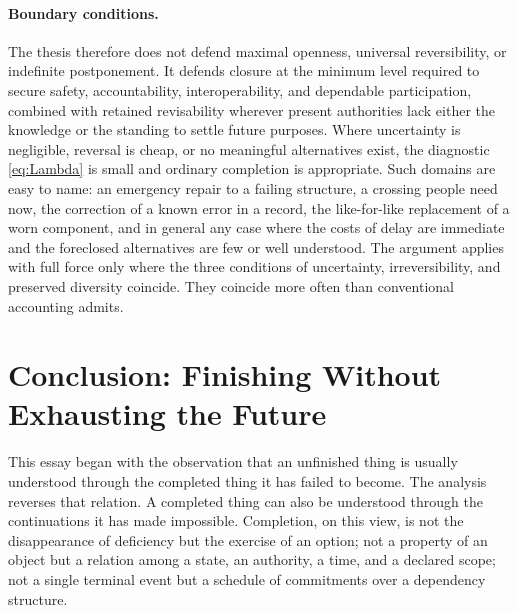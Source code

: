 \paragraph{Boundary conditions.} The thesis therefore does not defend maximal openness, universal reversibility, or indefinite postponement. It defends closure at the minimum level required to secure safety, accountability, interoperability, and dependable participation, combined with retained revisability wherever present authorities lack either the knowledge or the standing to settle future purposes. Where uncertainty is negligible, reversal is cheap, or no meaningful alternatives exist, the diagnostic \eqref{eq:Lambda} is small and ordinary completion is appropriate. Such domains are easy to name: an emergency repair to a failing structure, a crossing people need now, the correction of a known error in a record, the like-for-like replacement of a worn component, and in general any case where the costs of delay are immediate and the foreclosed alternatives are few or well understood. The argument applies with full force only where the three conditions of uncertainty, irreversibility, and preserved diversity coincide. They coincide more often than conventional accounting admits.

\section{Conclusion: Finishing Without Exhausting the Future}

This essay began with the observation that an unfinished thing is usually understood through the completed thing it has failed to become. The analysis reverses that relation. A completed thing can also be understood through the continuations it has made impossible. Completion, on this view, is not the disappearance of deficiency but the exercise of an option; not a property of an object but a relation among a state, an authority, a time, and a declared scope; not a single terminal event but a schedule of commitments over a dependency structure.

